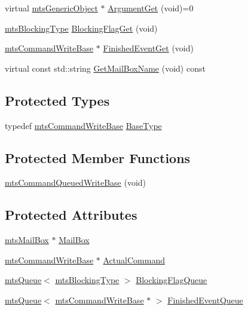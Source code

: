 \begin{DoxyCompactItemize}
\item 
virtual \hyperlink{classmts_generic_object}{mts\+Generic\+Object} $\ast$ \hyperlink{classmts_command_queued_write_base_aa13d3a24097258f9975595930d582540}{Argument\+Get} (void)=0
\item 
\hyperlink{mts_forward_declarations_8h_ad7426ccb6c883bc780d0ee197dddcbe7}{mts\+Blocking\+Type} \hyperlink{classmts_command_queued_write_base_aa138c8036f3181703af3395845c92bd0}{Blocking\+Flag\+Get} (void)
\item 
\hyperlink{classmts_command_write_base}{mts\+Command\+Write\+Base} $\ast$ \hyperlink{classmts_command_queued_write_base_a2b0fa088500491f1a6af2d2f01d35733}{Finished\+Event\+Get} (void)
\item 
virtual const std\+::string \hyperlink{classmts_command_queued_write_base_afe6398dca9145cde8de0ba0d8de993df}{Get\+Mail\+Box\+Name} (void) const 
\end{DoxyCompactItemize}
\subsection*{Protected Types}
\begin{DoxyCompactItemize}
\item 
typedef \hyperlink{classmts_command_write_base}{mts\+Command\+Write\+Base} \hyperlink{classmts_command_queued_write_base_aff4a3cf3c103da033abb3cbee439d1ce}{Base\+Type}
\end{DoxyCompactItemize}
\subsection*{Protected Member Functions}
\begin{DoxyCompactItemize}
\item 
\hyperlink{classmts_command_queued_write_base_a37c683e821be080652509253afdf26f4}{mts\+Command\+Queued\+Write\+Base} (void)
\end{DoxyCompactItemize}
\subsection*{Protected Attributes}
\begin{DoxyCompactItemize}
\item 
\hyperlink{classmts_mail_box}{mts\+Mail\+Box} $\ast$ \hyperlink{classmts_command_queued_write_base_aff12f0b8e184ae4891388a5c0c647724}{Mail\+Box}
\item 
\hyperlink{classmts_command_write_base}{mts\+Command\+Write\+Base} $\ast$ \hyperlink{classmts_command_queued_write_base_a0b7c5cdfff1c742e84796cf3f80bbd68}{Actual\+Command}
\item 
\hyperlink{classmts_queue}{mts\+Queue}$<$ \hyperlink{mts_forward_declarations_8h_ad7426ccb6c883bc780d0ee197dddcbe7}{mts\+Blocking\+Type} $>$ \hyperlink{classmts_command_queued_write_base_a8aba2d8465fe58370e4058b9b4998621}{Blocking\+Flag\+Queue}
\item 
\hyperlink{classmts_queue}{mts\+Queue}$<$ \hyperlink{classmts_command_write_base}{mts\+Command\+Write\+Base} $\ast$ $>$ \hyperlink{classmts_command_queued_write_base_a67c11afa021916f995d1d537312c9a4c}{Finished\+Event\+Queue}
\end{DoxyCompactItemize}
